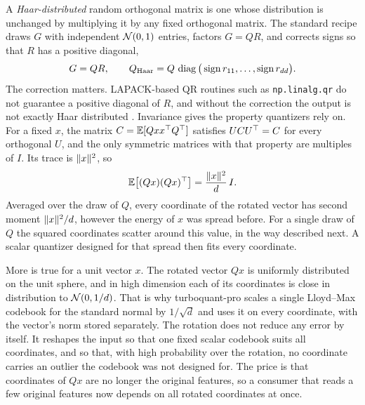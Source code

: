 A \emph{Haar-distributed} random orthogonal matrix is one whose distribution is
unchanged by multiplying it by any fixed orthogonal matrix. The standard recipe
draws $G$ with independent $\mathcal{N}(0,1)$ entries, factors $G=QR$, and
corrects signs so that $R$ has a positive diagonal,
\begin{equation}\label{eq:ch01:haar}
G=QR,\qquad Q_{\mathrm{Haar}}=Q\,\operatorname{diag}\big(\operatorname{sign}r_{11},\dots,\operatorname{sign}r_{dd}\big).
\end{equation}
The correction matters. LAPACK-based QR routines such as \texttt{np.linalg.qr} do not guarantee a
positive diagonal of $R$, and without the correction the output is not exactly Haar
distributed \cite{mezzadri2007}. Invariance gives the property quantizers rely
on. For a fixed $x$, the matrix $C=\mathbb{E}[Qxx^{\top} Q^{\top}]$ satisfies $UCU^{\top}=C$ for every
orthogonal $U$, and the only symmetric matrices with that property are
multiples of $I$. Its trace is $\lVert x\rVert^2$, so
\begin{equation}\label{eq:ch01:spread}
\mathbb{E}\big[(Qx)(Qx)^{\top}\big]=\frac{\lVert x\rVert^2}{d}\,I .
\end{equation}
Averaged over the draw of $Q$, every coordinate of the rotated vector has
second moment $\lVert x\rVert^2/d$, however the energy of $x$ was spread before. For
a single draw of $Q$ the squared coordinates scatter around this value, in the
way described next. A scalar quantizer designed for that
spread then fits every coordinate.

More is true for a unit vector $x$. The rotated vector $Qx$ is uniformly
distributed on the unit sphere, and in high dimension each of its
coordinates is close in distribution to $\mathcal{N}(0,1/d)$. That is why
turboquant-pro scales a single Lloyd--Max codebook for the standard normal by
$1/\sqrt d$ and uses it on every coordinate, with the vector's norm stored
separately. The rotation does not reduce any error by itself. It reshapes the
input so that one fixed scalar codebook suits all coordinates, and so that,
with high probability over the rotation, no coordinate carries an outlier the
codebook was not designed for. The price is
that coordinates of $Qx$ are no longer the original features, so a consumer
that reads a few original features now depends on all rotated coordinates at
once.

